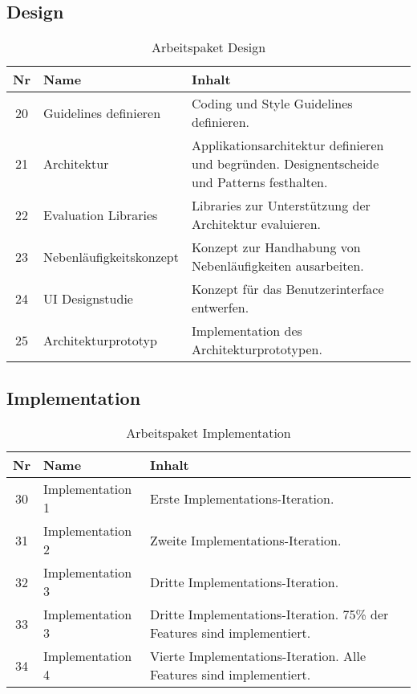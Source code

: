 \subsection{Design}
\begin{table}[H]
\begin{tabularx}{\textwidth}{ c | l | X }
\textbf{Nr} & \textbf{Name} & \textbf{Inhalt} \\ \hline
20 & Guidelines definieren & Coding und Style Guidelines definieren.\\ \hline
21 & Architektur & Applikationsarchitektur definieren und begründen. Designentscheide und Patterns festhalten.\\ \hline
22 & Evaluation Libraries & Libraries zur Unterstützung der Architektur evaluieren.\\ \hline
23 & Nebenläufigkeitskonzept & Konzept zur Handhabung von Nebenläufigkeiten ausarbeiten.\\ \hline
24 & UI Designstudie & Konzept für das Benutzerinterface entwerfen.\\ \hline
25 & Architekturprototyp & Implementation des Architekturprototypen.\\ \hline
\end{tabularx}
\caption{Arbeitspaket Design}
\end{table}

\subsection{Implementation}
\begin{table}[H]
\begin{tabularx}{\textwidth}{ c | l | X }
\textbf{Nr} & \textbf{Name} & \textbf{Inhalt} \\ \hline
30 & Implementation 1 & Erste Implementations-Iteration. \\ \hline
31 & Implementation 2 & Zweite Implementations-Iteration.\\ \hline
32 & Implementation 3 & Dritte Implementations-Iteration. \\ \hline
33 & Implementation 3 & Dritte Implementations-Iteration. 75\% der Features sind implementiert. \\ \hline
34 & Implementation 4 & Vierte Implementations-Iteration. Alle Features sind implementiert. \\ \hline
\end{tabularx}
\caption{Arbeitspaket Implementation}
\end{table}

